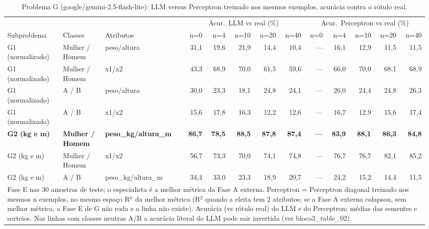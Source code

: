 \begin{table}[htbp]
\centering
\footnotesize
\caption{Problema G (google/gemini-2.5-flash-lite): LLM versus Perceptron treinado nos mesmos exemplos, acurácia contra o rótulo real.}
\label{tab:bloco3_G_faseE_LLM_vs_perceptron_flashlite}
\begin{tabular}{lllrrrrrrrrrr}
\toprule
 &  &  & \multicolumn{5}{c}{Acur.\ LLM vs real (\%)} & \multicolumn{5}{c}{Acur.\ Perceptron vs real (\%)} \\ \cmidrule(lr){4-8} \cmidrule(lr){9-13}
Subproblema & Classes & Atributos & n=0 & n=4 & n=10 & n=20 & n=40 & n=0 & n=4 & n=10 & n=20 & n=40 \\
\midrule
G1 (normalizado) & Mulher / Homem & peso/altura & 31,1 & 19,6 & 21,9 & 14,4 & 10,4 & — & 16,1 & 12,9 & 11,5 & 11,5 \\
G1 (normalizado) & Mulher / Homem & x1/x2 & 43,3 & 68,9 & 70,0 & 61,5 & 59,6 & — & 66,0 & 70,0 & 68,1 & 68,9 \\
G1 (normalizado) & A / B & peso/altura & 30,0 & 23,3 & 18,1 & 24,8 & 24,1 & — & 26,0 & 24,4 & 24,8 & 26,3 \\
G1 (normalizado) & A / B & x1/x2 & 15,6 & 17,8 & 16,3 & 12,2 & 12,6 & — & 16,7 & 12,9 & 15,6 & 17,4 \\
\textbf{G2 (kg e m)} & \textbf{Mulher / Homem} & \textbf{peso\_kg/altura\_m} & \textbf{86,7} & \textbf{78,5} & \textbf{88,5} & \textbf{87,8} & \textbf{87,4} & \textbf{—} & \textbf{83,9} & \textbf{88,1} & \textbf{86,3} & \textbf{84,8} \\
G2 (kg e m) & Mulher / Homem & x1/x2 & 56,7 & 73,3 & 70,0 & 74,1 & 74,8 & — & 76,7 & 76,7 & 82,1 & 85,2 \\
G2 (kg e m) & A / B & peso\_kg/altura\_m & 34,4 & 33,0 & 23,3 & 18,9 & 20,7 & — & 24,2 & 15,2 & 14,4 & 11,5 \\
\bottomrule
\multicolumn{13}{p{0.95\linewidth}}{\footnotesize Fase E nas 30 amostras de teste; o especialista é a melhor métrica da Fase A externa. Perceptron = Perceptron diagonal treinado nos mesmos n exemplos, no mesmo espaço R$^n$ da melhor métrica (R$^2$ quando a eleita tem 2 atributos; se a Fase A externa colapsou, sem melhor métrica, a Fase E de G não roda e a linha não existe). Acurácia (vs rótulo real) do LLM e do Perceptron; médias das sementes e sorteios. Nas linhas com classes neutras A/B a acurácia literal do LLM pode sair invertida (ver bloco3\_table\_02).} \\
\end{tabular}
\end{table}
